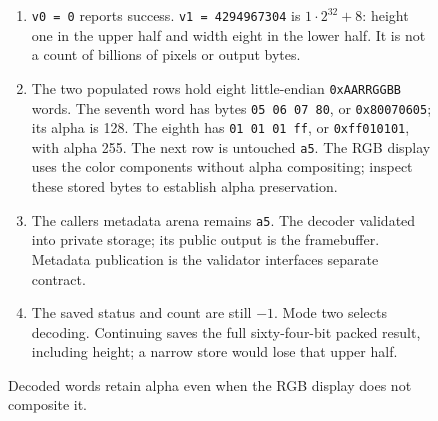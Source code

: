 \begin{figure}[htbp]
\begin{minipage}{\linewidth}
\begin{enumerate}
      \item \texttt{v0 = 0} reports success. \texttt{v1 = 4294967304} is $1\cdot2^{32}+8$: height one in the upper half and width eight in the lower half. It is not a count of billions of pixels or output bytes.
      \item The two populated rows hold eight little-endian \texttt{0xAARRGGBB} words. The seventh word has bytes \texttt{05 06 07 80}, or \texttt{0x80070605}; its alpha is 128. The eighth has \texttt{01 01 01 ff}, or \texttt{0xff010101}, with alpha 255. The next row is untouched \texttt{a5}. The RGB display uses the color components without alpha compositing; inspect these stored bytes to establish alpha preservation.
      \item The caller\textquotesingle s metadata arena remains \texttt{a5}. The decoder validated into private storage; its public output is the framebuffer. Metadata publication is the validator interface\textquotesingle s separate contract.
      \item The saved status and count are still $-1$. Mode two selects decoding. Continuing saves the full sixty-four-bit packed result, including height; a narrow store would lose that upper half.
    \end{enumerate}
  \end{minipage}
  \caption{Decoded words retain alpha even when the RGB display does not composite it.}
  \label{capture:030-qoi-f02}
  \label{qoi-f02}
\end{figure}
\par
